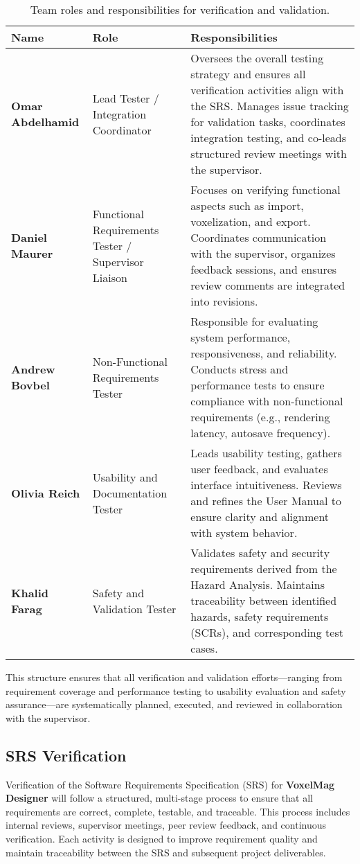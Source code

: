 \documentclass[12pt, titlepage]{article}
\begin{document}
\begin{table}[H]
\centering
\begin{tabular}{|p{3.5cm}|p{4cm}|p{7cm}|}
\hline
\textbf{Name} & \textbf{Role} & \textbf{Responsibilities} \\
\hline
\textbf{Omar Abdelhamid} & Lead Tester / Integration Coordinator & Oversees the overall testing strategy and ensures all verification activities align with the SRS. Manages issue tracking for validation tasks, coordinates integration testing, and co-leads structured review meetings with the supervisor. \\
\hline
\textbf{Daniel Maurer} & Functional Requirements Tester / Supervisor Liaison & Focuses on verifying functional aspects such as import, voxelization, and export. Coordinates communication with the supervisor, organizes feedback sessions, and ensures review comments are integrated into revisions. \\
\hline
\textbf{Andrew Bovbel} & Non-Functional Requirements Tester & Responsible for evaluating system performance, responsiveness, and reliability. Conducts stress and performance tests to ensure compliance with non-functional requirements (e.g., rendering latency, autosave frequency). \\
\hline
\textbf{Olivia Reich} & Usability and Documentation Tester & Leads usability testing, gathers user feedback, and evaluates interface intuitiveness. Reviews and refines the User Manual to ensure clarity and alignment with system behavior. \\
\hline
\textbf{Khalid Farag} & Safety and Validation Tester & Validates safety and security requirements derived from the Hazard Analysis. Maintains traceability between identified hazards, safety requirements (SCRs), and corresponding test cases. \\
\hline
\end{tabular}
\caption{Team roles and responsibilities for verification and validation.}
\end{table}

This structure ensures that all verification and validation efforts—ranging from requirement coverage and performance testing to usability evaluation and safety assurance—are systematically planned, executed, and reviewed in collaboration with the supervisor.
\subsection{SRS Verification}

Verification of the Software Requirements Specification (SRS) for \textbf{VoxelMag Designer} will follow a structured, multi-stage process to ensure that all requirements are correct, complete, testable, and traceable. This process includes internal reviews, supervisor meetings, peer review feedback, and continuous verification. Each activity is designed to improve requirement quality and maintain traceability between the SRS and subsequent project deliverables.
\end{document}
